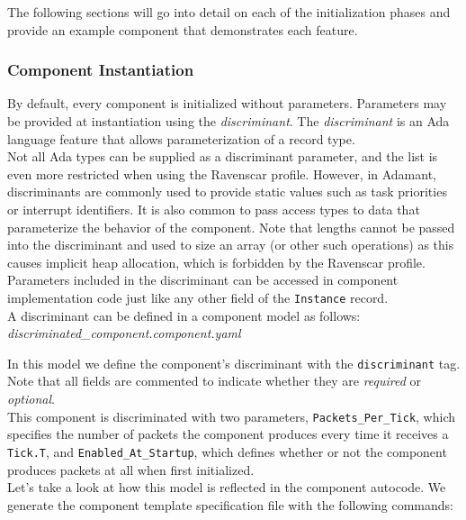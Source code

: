 The following sections will go into detail on each of the initialization phases and provide an example component that demonstrates each feature.

\subsubsection{Component Instantiation} \label{Component Instantiation}

By default, every component is initialized without parameters. Parameters may be provided at instantiation using the \textit{discriminant}. The \textit{discriminant} is an Ada language feature that allows parameterization of a record type. \\

Not all Ada types can be supplied as a discriminant parameter, and the list is even more restricted when using the Ravenscar profile. However, in Adamant, discriminants are commonly used to provide static values such as task priorities or interrupt identifiers. It is also common to pass access types to data that parameterize the behavior of the component. Note that lengths cannot be passed into the discriminant and used to size an array (or other such operations) as this causes implicit heap allocation, which is forbidden by the Ravenscar profile. Parameters included in the discriminant can be accessed in component implementation code just like any other field of the \texttt{Instance} record. \\ 

A discriminant can be defined in a component model as follows: \\

\textit{discriminated\_component.component.yaml}

In this model we define the component's discriminant with the \texttt{discriminant} tag. Note that all fields are commented to indicate whether they are \textit{required} or \textit{optional}. \\

This component is discriminated with two parameters, \texttt{Packets\_Per\_Tick}, which specifies the number of packets the component produces every time it receives a \texttt{Tick.T}, and \texttt{Enabled\_At\_Startup}, which defines whether or not the component produces packets at all when first initialized. \\

Let's take a look at how this model is reflected in the component autocode. We generate the component template specification file with the following commands:

